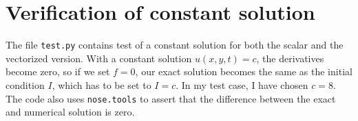 \documentclass[10pt, a4paper]{amsart}
\numberwithin{figure}{section}
\numberwithin{table}{section}
\begin{document}
\section{Verification of constant solution}

The file \texttt{test.py} contains test of a constant solution for both the
scalar and the vectorized version. With a constant solution $u(x,y,t) = c$, the derivatives
become zero, so if we set $f = 0$, our exact solution becomes the same as the
initial condition $I$, which has to be set to $I=c$. In my test case, I have
chosen $c=8$. The code also uses \texttt{nose.tools} to assert that the
difference between the exact and numerical solution is zero.
\end{document}
